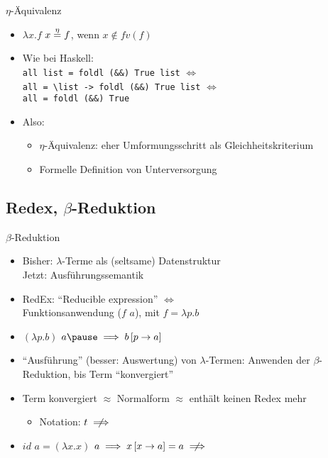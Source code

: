 \documentclass{beamer}
\begin{document}
\begin{frame}{$\eta$-Äquivalenz}
	\begin{itemize}
		\item $\lambda{}x.f$ $x \stackrel{\eta}{=} f$, wenn $x \notin fv(f)$
		\item Wie bei Haskell:\\
	              \texttt{all list = foldl (\&\&) True list} $\Leftrightarrow$\\
		      \texttt{all = \textbackslash{}list -> foldl (\&\&) True list} $\Leftrightarrow$\\
		      \texttt{all = foldl (\&\&) True}
		\item Also:
		\begin{itemize}
			\item $\eta$-Äquivalenz: eher Umformungsschritt als Gleichheitskriterium
			\item Formelle Definition von Unterversorgung
		\end{itemize}
	\end{itemize}
\end{frame}

\subsection{Redex, $\beta$-Reduktion}

\begin{frame}{$\beta$-Reduktion}
	\begin{itemize}
		\item Bisher: $\lambda$-Terme als (seltsame) Datenstruktur\\
		      Jetzt: Ausführungssemantik
		\pause
		\item RedEx: \enquote{Reducible expression} $\Leftrightarrow$\\
		      Funktionsanwendung ($f$ $a$), mit $f = \lambda{}p.b$
	      \item $(\lambda{}p.b)$ $a\pause \implies b\left[p \to a\right]$
		\pause
		\item \enquote{Ausführung} (besser: Auswertung) von $\lambda$-Termen: Anwenden der $\beta$-Reduktion, bis Term \enquote{konvergiert}
		\item Term konvergiert $\approx$ Normalform $\approx$ enthält keinen Redex mehr
		\begin{itemize}
			\item Notation: $t \centernot\implies$
		\end{itemize}
		\pause
		\item $id$ $a = (\lambda{}x.x)$ $a \implies x\left[x \to a\right] = a \centernot\implies$
	\end{itemize}
\end{frame}
\end{document}
